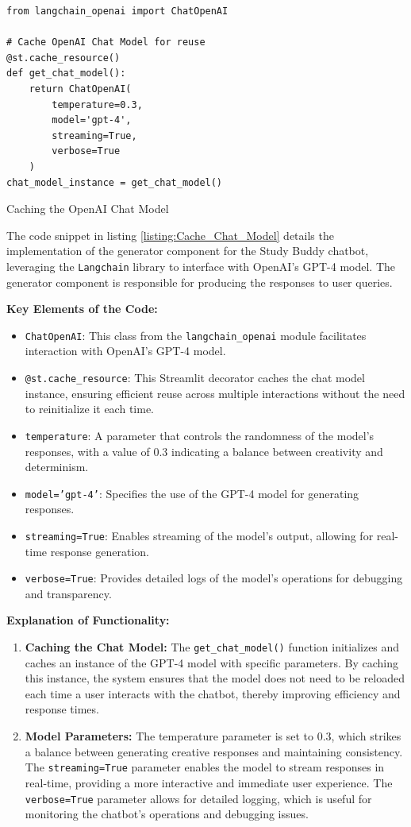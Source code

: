 \begin{listing}[H]
\begin{verbatim}
from langchain_openai import ChatOpenAI

# Cache OpenAI Chat Model for reuse
@st.cache_resource()
def get_chat_model():
    return ChatOpenAI(
        temperature=0.3,
        model='gpt-4',
        streaming=True,
        verbose=True
    )
chat_model_instance = get_chat_model()
\end{verbatim}
\caption{Caching the OpenAI Chat Model}
\label{listing:Cache_Chat_Model}
\end{listing}

The code snippet in listing \ref{listing:Cache_Chat_Model} details the implementation of the generator component for the Study Buddy chatbot, leveraging the \texttt{Langchain} library to interface with OpenAI's GPT-4 model. The generator component is responsible for producing the responses to user queries.

\textbf{Key Elements of the Code:}
\begin{itemize}
    \item \texttt{ChatOpenAI}: This class from the \texttt{langchain\_openai} module facilitates interaction with OpenAI's GPT-4 model.
    \item \texttt{@st.cache\_resource}: This Streamlit decorator caches the chat model instance, ensuring efficient reuse across multiple interactions without the need to reinitialize it each time.
    \item \texttt{temperature}: A parameter that controls the randomness of the model's responses, with a value of 0.3 indicating a balance between creativity and determinism.
    \item \texttt{model='gpt-4'}: Specifies the use of the GPT-4 model for generating responses.
    \item \texttt{streaming=True}: Enables streaming of the model's output, allowing for real-time response generation.
    \item \texttt{verbose=True}: Provides detailed logs of the model's operations for debugging and transparency.
\end{itemize}

\textbf{Explanation of Functionality:}
\begin{enumerate}
    \item \textbf{Caching the Chat Model:} The \texttt{get\_chat\_model()} function initializes and caches an instance of the GPT-4 model with specific parameters. By caching this instance, the system ensures that the model does not need to be reloaded each time a user interacts with the chatbot, thereby improving efficiency and response times.
    \item \textbf{Model Parameters:} The temperature parameter is set to 0.3, which strikes a balance between generating creative responses and maintaining consistency. The \texttt{streaming=True} parameter enables the model to stream responses in real-time, providing a more interactive and immediate user experience. The \texttt{verbose=True} parameter allows for detailed logging, which is useful for monitoring the chatbot's operations and debugging issues.
\end{enumerate}

